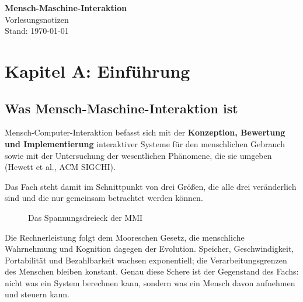 \documentclass[12pt, a4paper]{article}
\begin{document}
\begin{center}
  {\LARGE\bfseries Mensch-Maschine-Interaktion}\\[6pt]
  {\large Vorlesungsnotizen}\\[4pt]
  {\small Stand: \today}
\end{center}

\vspace{1em}
\tableofcontents
\newpage

\section{Kapitel A: Einführung}

\subsection{Was Mensch-Maschine-Interaktion ist}

\begin{definitionbox}
Mensch-Computer-Interaktion befasst sich mit der \textbf{Konzeption, Bewertung und
Implementierung} interaktiver Systeme für den menschlichen Gebrauch sowie mit der
Untersuchung der wesentlichen Phänomene, die sie umgeben (Hewett et al., ACM SIGCHI).
\end{definitionbox}

Das Fach steht damit im Schnittpunkt von drei Größen, die alle drei veränderlich sind
und die nur gemeinsam betrachtet werden können.

\begin{figure}[H]
\centering
{}
\caption{Das Spannungsdreieck der MMI}
\end{figure}

Die Rechnerleistung folgt dem Mooreschen Gesetz, die menschliche Wahrnehmung und
Kognition dagegen der Evolution. Speicher, Geschwindigkeit, Portabilität und
Bezahlbarkeit wachsen exponentiell; die Verarbeitungsgrenzen des Menschen bleiben
konstant. Genau diese Schere ist der Gegenstand des Fachs: nicht was ein System
berechnen kann, sondern was ein Mensch davon aufnehmen und steuern kann.
\end{document}
